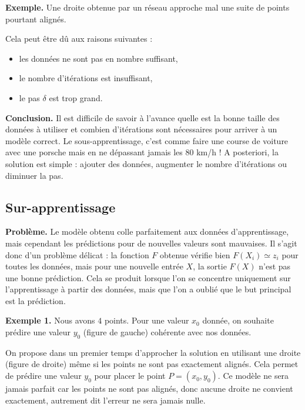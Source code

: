 \documentclass[11pt,class=report,crop=false]{standalone}
\begin{document}
\bigskip
\textbf{Exemple.} Une droite obtenue par un réseau approche mal une suite de points pourtant alignés.

Cela peut être dû aux raisons suivantes :
\begin{itemize}
  \item les données ne sont pas en nombre suffisant, 
  \item le nombre d'itérations est insuffisant,
  \item le pas $\delta$ est trop grand.
\end{itemize}

\bigskip

\textbf{Conclusion.} 
Il est difficile de savoir à l'avance quelle est la bonne taille
des données à utiliser et combien d'itérations sont nécessaires pour arriver à un modèle correct. Le sous-apprentissage, c'est comme faire une course de voiture avec une porsche mais en ne dépassant jamais les 80 km/h !
A posteriori, la solution est simple : ajouter des données, augmenter le nombre d'itérations ou diminuer la pas.

 
\subsection{Sur-apprentissage}


\textbf{Problème.} Le modèle obtenu \og{}colle\fg{} parfaitement aux données d'apprentissage, mais cependant les prédictions pour de nouvelles valeurs sont mauvaises.
Il s'agit donc d'un problème délicat : la fonction $F$ obtenue vérifie bien $F(X_i) \simeq z_i$ pour toutes les données, mais pour une nouvelle entrée $X$, la sortie $F(X)$ n'est pas une bonne prédiction. Cela se produit lorsque l'on se concentre uniquement sur l'apprentissage à partir des données, mais que l'on a oublié que le but principal est la prédiction.

\bigskip


\textbf{Exemple 1.} Nous avons $4$ points.
Pour une valeur $x_0$ donnée, on souhaite prédire une valeur $y_0$ (figure de gauche) cohérente avec nos données.

On propose dans un premier temps d'approcher la solution en utilisant une droite (figure de droite) même si les points ne sont pas exactement alignés. Cela permet de prédire une valeur $y_0$ pour placer le point $P=(x_0,y_0)$.
Ce modèle ne sera jamais parfait car les points ne sont pas alignés, donc aucune droite ne convient exactement, autrement dit l'erreur ne sera jamais nulle.
\end{document}
